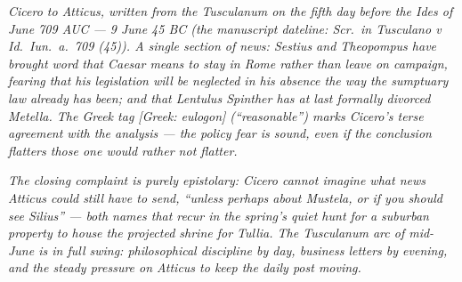 
\textit{Cicero to Atticus, written from the Tusculanum
on the fifth day before the Ides of June 709 AUC ---
9 June 45 BC (the manuscript dateline: \textit{Scr.\ in
Tusculano v Id.\ Iun.\ a.\ 709 (45)}). A single
section of news: Sestius and Theopompus have brought
word that Caesar means to stay in Rome rather than
leave on campaign, fearing that his legislation
will be neglected in his absence the way the
sumptuary law already has been; and that Lentulus
Spinther has at last formally divorced Metella. The
Greek tag \textit{[Greek: eulogon]} (``reasonable'')
marks Cicero's terse agreement with the analysis ---
the policy fear is sound, even if the conclusion
flatters those one would rather not flatter.}

\textit{The closing complaint is purely epistolary: Cicero
cannot imagine what news Atticus could still have to
send, ``unless perhaps about Mustela, or if you
should see Silius'' --- both names that recur in the
spring's quiet hunt for a suburban property to house
the projected shrine for Tullia. The Tusculanum
arc of mid-June is in full swing: philosophical
discipline by day, business letters by evening, and
the steady pressure on Atticus to keep the daily
post moving.}

